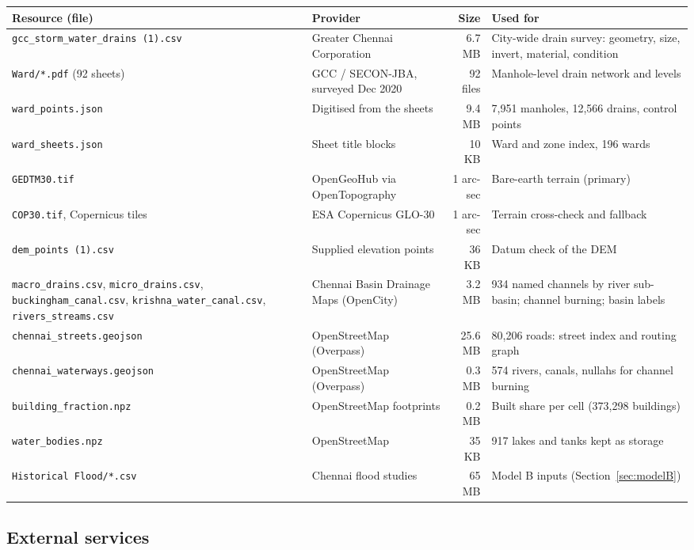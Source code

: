 \documentclass[11pt,a4paper]{article}
\begin{document}
{\small
\begin{longtable}{@{}p{4.3cm}p{3.1cm}r p{4.6cm}@{}}
\toprule
\textbf{Resource (file)} & \textbf{Provider} & \textbf{Size} & \textbf{Used for}\\
\midrule\endhead
\texttt{gcc\_storm\_water\_drains (1).csv} & Greater Chennai Corporation & 6.7 MB & City-wide drain survey: geometry, size, invert, material, condition\\
\texttt{Ward/*.pdf} (92 sheets) & GCC / SECON-JBA, surveyed Dec 2020 & 92 files & Manhole-level drain network and levels\\
\texttt{ward\_points.json} & Digitised from the sheets & 9.4 MB & 7,951 manholes, 12,566 drains, control points\\
\texttt{ward\_sheets.json} & Sheet title blocks & 10 KB & Ward and zone index, 196 wards\\
\texttt{GEDTM30.tif} & OpenGeoHub via OpenTopography & 1 arc-sec & Bare-earth terrain (primary)\\
\texttt{COP30.tif}, Copernicus tiles & ESA Copernicus GLO-30 & 1 arc-sec & Terrain cross-check and fallback\\
\texttt{dem\_points (1).csv} & Supplied elevation points & 36 KB & Datum check of the DEM\\
\texttt{macro\_drains.csv}, \texttt{micro\_drains.csv}, \texttt{buckingham\_canal.csv}, \texttt{krishna\_water\_canal.csv}, \texttt{rivers\_streams.csv} & Chennai Basin Drainage Maps (OpenCity) & 3.2 MB & 934 named channels by river sub-basin; channel burning; basin labels\\
\texttt{chennai\_streets.geojson} & OpenStreetMap (Overpass) & 25.6 MB & 80,206 roads: street index and routing graph\\
\texttt{chennai\_waterways.geojson} & OpenStreetMap (Overpass) & 0.3 MB & 574 rivers, canals, nullahs for channel burning\\
\texttt{building\_fraction.npz} & OpenStreetMap footprints & 0.2 MB & Built share per cell (373,298 buildings)\\
\texttt{water\_bodies.npz} & OpenStreetMap & 35 KB & 917 lakes and tanks kept as storage\\
\texttt{Historical Flood/*.csv} & Chennai flood studies & 65 MB & Model B inputs (Section~\ref{sec:modelB})\\
\bottomrule
\end{longtable}}

\subsection{External services}
\end{document}
